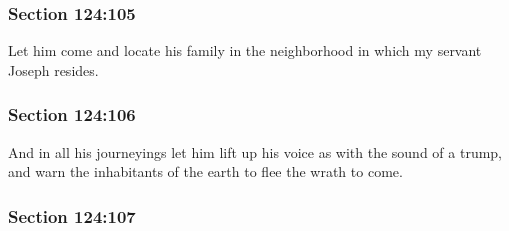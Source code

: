
	\subsubsection{Section 124:105} %
		\label{DC124-105}

		Let him come and locate his family in the neighborhood in which my servant Joseph resides.


	\subsubsection{Section 124:106} %
		\label{DC124-106}

		And in all his journeyings let him lift up his voice as with the sound of a trump, and warn the inhabitants of the earth to flee the wrath to come.


	\subsubsection{Section 124:107} %
		\label{DC124-107}

